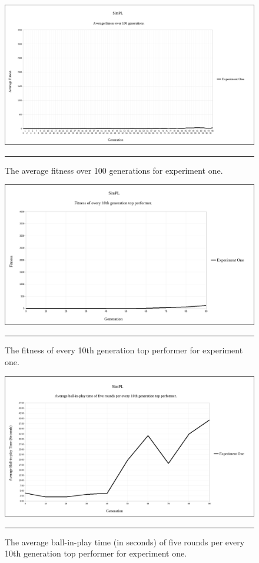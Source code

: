 \begin{figure}[ht!]  
  \centering
  \includegraphics[width=5in]{../Figures/Chapter3/exp1_avg_fit.png}
  \rule{35em}{0.5pt}
  \caption[Experiment One Average Fitness]{The average fitness over 100 generations for experiment one.}
  \label{fig:exp1_avg_fit}
\end{figure}

\begin{figure}[ht!]  
  \centering
  \includegraphics[width=5in]{../Figures/Chapter3/exp1_10_tops.png}
  \rule{35em}{0.5pt}
  \caption[Experiment One Top Performers]{The fitness of every 10th generation top performer for experiment one.}
  \label{fig:exp1_10_tops}
\end{figure}

\begin{figure}[ht!]  
  \centering
  \includegraphics[width=5in]{../Figures/Chapter3/exp1_10_tops_times.png}
  \rule{35em}{0.5pt}
  \caption[Experiment One Top Performers Tournament]{The average ball-in-play time (in seconds) of five rounds per every 10th generation top performer for experiment one.}
  \label{fig:exp1_10_tops_times}
\end{figure}

